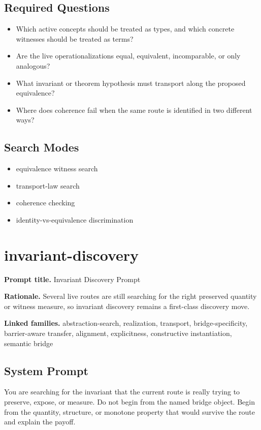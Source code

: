 \documentclass[11pt]{article}
\begin{document}
\subsection*{Required Questions}
\begin{itemize}[leftmargin=*,itemsep=0.2em]
\item Which active concepts should be treated as types, and which concrete witnesses should be treated as terms?
\item Are the live operationalizations equal, equivalent, incomparable, or only analogous?
\item What invariant or theorem hypothesis must transport along the proposed equivalence?
\item Where does coherence fail when the same route is identified in two different ways?
\end{itemize}
\subsection*{Search Modes}
\begin{itemize}[leftmargin=*,itemsep=0.2em]
\item equivalence witness search
\item transport-law search
\item coherence checking
\item identity-vs-equivalence discrimination
\end{itemize}
\section{invariant-discovery}
\textbf{Prompt title.} Invariant Discovery Prompt

\textbf{Rationale.} Several live routes are still searching for the right preserved quantity or witness measure, so invariant discovery remains a first-class discovery move.

\textbf{Linked families.} abstraction-search, realization, transport, bridge-specificity, barrier-aware transfer, alignment, explicitness, constructive instantiation, semantic bridge

\subsection*{System Prompt}
You are searching for the invariant that the current route is really trying to preserve, expose, or measure. Do not begin from the named bridge object. Begin from the quantity, structure, or monotone property that would survive the route and explain the payoff.
\end{document}
